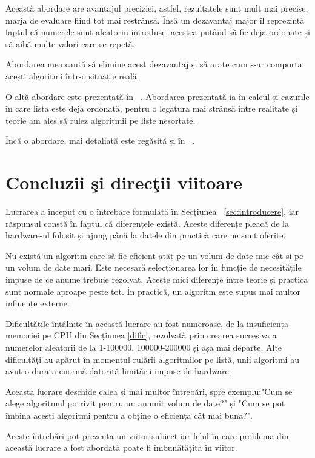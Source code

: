 \documentclass[12pt]{article}
\begin{document}
Această abordare are avantajul preciziei, astfel, rezultatele sunt mult mai precise, marja de evaluare fiind tot mai restrânsă. 
Însă un dezavantaj major îl reprezintă faptul că numerele sunt aleatoriu introduse, acestea putând să fie deja ordonate și să aibă multe valori care se repetă.

Abordarea mea caută să elimine acest dezavantaj și să arate cum s-ar comporta acești algoritmi într-o situație reală.

O altă abordare este prezentată în ~\cite{COMP2015}. Abordarea prezentată ia în calcul și cazurile în care lista este deja ordonată, pentru o legătura mai strânsă între realitate și teorie am ales să rulez algoritmii pe liste nesortate.

Încă o abordare, mai detaliată este regăsită și în ~\cite{HUTTER201479}.
\section{Concluzii şi direcţii viitoare}
\label{sec:concluzii}
Lucrarea a început cu o întrebare formulată în Secțiunea
~\ref{sec:introducere}, iar răspunsul constă în faptul că diferențele există. Aceste diferențe pleacă de la hardware-ul folosit și ajung până la datele din practică care ne sunt oferite.

Nu există un algoritm care să fie eficient atât pe un volum de date mic cât și pe un volum de date mari. Este necesară selecționarea lor în funcție de necesitățile impuse de ce anume trebuie rezolvat.
Aceste mici diferențe între teorie și practică sunt normale aproape peste tot. În practică, un algoritm este supus mai multor influențe externe.

Dificultățile întâlnite în această lucrare au fost numeroase, de la insuficiența memoriei pe CPU din Secțiunea \ref{dific}, rezolvată prin crearea succesiva a numerelor aleatorii de la 1-100000, 100000-200000 și așa mai departe. Alte dificultăți au apărut în momentul rulării algoritmilor pe listă, unii algoritmi au avut o durata enormă datorită limitării impuse de hardware.

\pagebreak
Aceasta lucrare deschide calea și mai multor întrebări, spre exemplu:"Cum se alege algoritmul potrivit pentru un anumit volum de date?" și "Cum se pot îmbina acești algoritmi pentru a obține o eficiență cât mai buna?".

Aceste întrebări pot prezenta un viitor subiect iar felul în care problema din această lucrare a fost abordată poate fi îmbunătățită în viitor.
\pagebreak
\printbibliography
\end{document}
